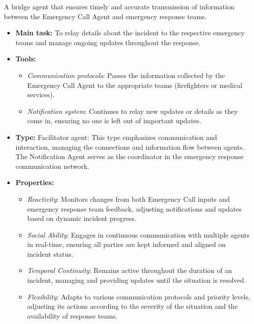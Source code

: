 A bridge agent that ensures timely and accurate transmission of information between the Emergency Call Agent and emergency response teams.

\begin{itemize}
    \item \textbf{Main task:} To relay details about the incident to the respective emergency teams and manage ongoing updates throughout the response.
    \item \textbf{Tools:}
    \begin{itemize}
        \item \emph{Communication protocols}: Passes the information collected by the Emergency Call Agent to the appropriate teams (firefighters or medical services).
        \item \emph{Notification system}: Continues to relay new updates or details as they come in, ensuring no one is left out of important updates.
    \end{itemize}
    \item \textbf{Type:} Facilitator agent: This type emphasizes communication and interaction, managing the connections and information flow between agents. The Notification Agent serves as the coordinator in the emergency response communication network.
    \item \textbf{Properties:}
    \begin{itemize}
        \item \emph{Reactivity}: Monitors changes from both Emergency Call inputs and emergency response team feedback, adjusting notifications and updates based on dynamic incident progress.
        \item \emph{Social Ability}: Engages in continuous communication with multiple agents in real-time, ensuring all parties are kept informed and aligned on incident status.
        \item \emph{Temporal Continuity}: Remains active throughout the duration of an incident, managing and providing updates until the situation is resolved.
        \item \emph{Flexibility}: Adapts to various communication protocols and priority levels, adjusting its actions according to the severity of the situation and the availability of response teams.
    \end{itemize}
\end{itemize}
